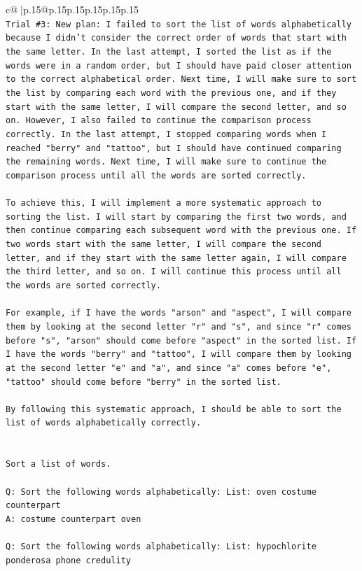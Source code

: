 \documentclass{article}
\begin{document}
{\begin{supertabular}{c@{$\;$}|p{.15\linewidth}@{}p{.15\linewidth}p{.15\linewidth}p{.15\linewidth}p{.15\linewidth}p{.15\linewidth}}
{{{\\ 
\texttt{Trial \#3: New plan: I failed to sort the list of words alphabetically because I didn't consider the correct order of words that start with the same letter. In the last attempt, I sorted the list as if the words were in a random order, but I should have paid closer attention to the correct alphabetical order. Next time, I will make sure to sort the list by comparing each word with the previous one, and if they start with the same letter, I will compare the second letter, and so on. However, I also failed to continue the comparison process correctly. In the last attempt, I stopped comparing words when I reached "berry" and "tattoo", but I should have continued comparing the remaining words. Next time, I will make sure to continue the comparison process until all the words are sorted correctly. } \\
\\ 
\texttt{To achieve this, I will implement a more systematic approach to sorting the list. I will start by comparing the first two words, and then continue comparing each subsequent word with the previous one. If two words start with the same letter, I will compare the second letter, and if they start with the same letter again, I will compare the third letter, and so on. I will continue this process until all the words are sorted correctly. } \\
\\ 
\texttt{For example, if I have the words "arson" and "aspect", I will compare them by looking at the second letter "r" and "s", and since "r" comes before "s", "arson" should come before "aspect" in the sorted list. If I have the words "berry" and "tattoo", I will compare them by looking at the second letter "e" and "a", and since "a" comes before "e", "tattoo" should come before "berry" in the sorted list. } \\
\\ 
\texttt{By following this systematic approach, I should be able to sort the list of words alphabetically correctly.} \\
\\ 
\\ 
\texttt{Sort a list of words.} \\
\\ 
\texttt{Q: Sort the following words alphabetically: List: oven costume counterpart} \\
\texttt{A: costume counterpart oven} \\
\\ 
\texttt{Q: Sort the following words alphabetically: List: hypochlorite ponderosa phone credulity} \\
}}}
\end{supertabular}}
\end{document}
